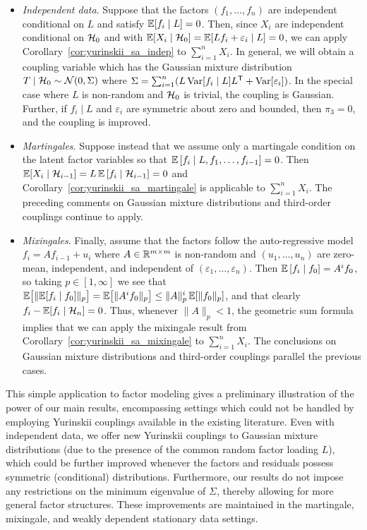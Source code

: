 \begin{itemize}
  \item \emph{Independent data}.
    Suppose that the factors $(f_1, \ldots,
    f_n)$ are independent conditional on $L$ and satisfy
    $\mathbb{E} [ f_i \mid L ] = 0$.
    Then, since $X_i$ are independent conditional on $\mathcal{H}_0$ and with
    $\mathbb{E} [ X_i \mid \mathcal{H}_0 ] = \mathbb{E} [ L f_i + \varepsilon_i \mid L ] = 0$,
    we can apply Corollary~\ref{cor:yurinskii_sa_indep} to $\sum_{i=1}^n X_i$.
    In general, we will obtain a coupling variable which has the Gaussian
    mixture distribution $T \mid \mathcal{H}_0 \sim \mathcal{N}(0, \Sigma)$ where
    $\Sigma= \sum_{i=1}^n (L\operatorname{Var}[f_i \mid L]L^{\mathsf{T}} +\operatorname{Var}[\varepsilon_i])$.
    In the special case where $L$ is non-random
    and $\mathcal{H}_0$ is trivial, the coupling is Gaussian. Further,
    if $f_i\mid L$ and $\varepsilon_i$ are symmetric about zero
    and bounded, then $\pi_3=0$, and the coupling is improved.

  \item \emph{Martingales}.
    Suppose instead that we assume only a martingale
    condition on the latent factor variables so that
    $\mathbb{E} \left[ f_i \mid L, f_1, \ldots, f_{i-1} \right] = 0$.
    Then $\mathbb{E} [ X_i \mid \mathcal{H}_{i-1} ]
    = L\, \mathbb{E} \left[ f_i \mid \mathcal{H}_{i-1} \right] = 0$
    and Corollary~\ref{cor:yurinskii_sa_martingale} is applicable to
    $\sum_{i=1}^n X_i$.
    The preceding comments on Gaussian mixture distributions
    and third-order couplings continue to apply.

  \item \emph{Mixingales}.
    Finally, assume that the factors follow the
    auto-regressive model $f_i = A f_{i-1} + u_i$ where
    $A \in \mathbb{R}^{m \times m}$ is non-random and $(u_1, \ldots, u_n)$ are
    zero-mean, independent, and independent of
    $(\varepsilon_1, \ldots, \varepsilon_n)$.
    Then $\mathbb{E} \left[ f_i \mid f_0 \right] = A^i f_0$, so taking
    $p \in [1, \infty]$ we see that
    $\mathbb{E} \big[ \| \mathbb{E} [ f_i \mid f_0 ] \|_p \big]
    = \mathbb{E} \big[ \| A^i f_0 \|_p \big] \leq \|A\|_p^i\,\mathbb{E} [ \|f_0\|_p ]$,
    and that clearly $f_i - \mathbb{E} [ f_i \mid \mathcal{H}_n ] = 0$.
    Thus, whenever $\|A\|_p < 1$, the geometric sum formula implies that
    we can apply the mixingale result from
    Corollary~\ref{cor:yurinskii_sa_mixingale} to
    $\sum_{i=1}^n X_i$. The conclusions on Gaussian mixture distributions
    and third-order couplings parallel the previous cases.
\end{itemize}

This simple application to factor modeling gives a preliminary illustration of
the power of our main results, encompassing settings which could not be handled
by employing Yurinskii couplings available in the existing literature. Even
with independent data, we offer new Yurinskii couplings to Gaussian mixture
distributions (due to the presence of the common random factor loading $L$),
which could be further improved whenever the factors and residuals possess
symmetric (conditional) distributions. Furthermore, our results do not impose
any restrictions on the minimum eigenvalue of $\Sigma$, thereby allowing for
more general factor structures. These improvements are maintained in the
martingale, mixingale, and weakly dependent stationary data settings.

